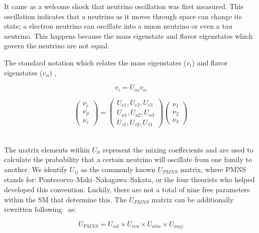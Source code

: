 It came as a welcome shock that neutrino oscillation was first measured.
This oscillation indicates that a neutrino as it moves through space can change its state; a electron neutrino can oscillate into a muon neutrino or even a tau neutrino.
This happens because the mass eigenstate and flavor eigenstates which govern the neutrino are not equal.

The standard notation which relates the mass eigenstates ($v_{i}$) and flavor eigenstates ($v_{\alpha}$) ,

\begin{equation}
  v_{i} = U_{i\alpha}v_{\alpha}
\end{equation}
\label{eq:relate_eigenstates}

\begin{equation}
\begin{pmatrix}
\nu_e\\
\nu_{\mu}\\
\nu_{\tau}
\end{pmatrix}
=
\begin{pmatrix}
U_{e1}, U_{e2}, U_{e3} \\
U_{u1}, U_{u2}, U_{u3} \\
U_{\tau1}, U_{\tau2}, U_{\tau3}
\end{pmatrix}
\begin{pmatrix}
\nu_1\\
\nu_2\\
\nu_3
\end{pmatrix}
\end{equation}
~\label{eq:mass_eigenstates}

The matrix elements within $U_{li}$ represent the mixing coeffecients and are used to calculate the prabability that a certain neutrino will oscillate from one family to another.
We identify $U_{ij}$ as the commonly known $U_{PMNS}$ matrix, where PMNS stands for: Pontecorvo–Maki–Nakagawa–Sakata, or the four theorists who helped developed this convention.
Luckily, there are not a total of nine free parameters within the SM that determine this.
The $U_{PMNS}$ matrix can be additionally rewritten following~\citep{Pontecorvo:1957qd, 1962PThPh..28..870M} as:

\begin{equation}
U_{PMNS}
=
U_{sol} \times U_{rea} \times U_{atm} \times U_{maj}
\end{equation}
~\label{eq:uij_matrix_simp}

